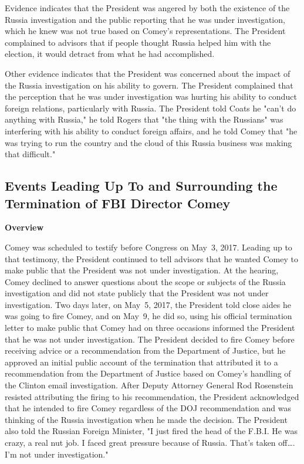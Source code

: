 Evidence indicates that the President was angered by both the existence of the Russia investigation and the public reporting that he was under investigation, which he knew was not true based on Comey's representations.
The President complained to advisors that if people thought Russia helped him with the election, it would detract from what he had accomplished.

Other evidence indicates that the President was concerned about the impact of the Russia investigation on his ability to govern.
The President complained that the perception that he was under investigation was hurting his ability to conduct foreign relations, particularly with Russia.
The President told Coats he "can't do anything with Russia," he told Rogers that "the thing with the Russians" was interfering with his ability to conduct foreign affairs, and he told Comey that "he was trying to run the country and the cloud of this Russia business was making that difficult."

\subsection{Events Leading Up To and Surrounding the Termination of FBI Director Comey}

\begin{center}
\textbf{Overview}
\end{center}

Comey was scheduled to testify before Congress on May~3, 2017.
Leading up to that testimony, the President continued to tell advisors that he wanted Comey to make public that the President was not under investigation.
At the hearing, Comey declined to answer questions about the scope or subjects of the Russia investigation and did not state publicly that the President was not under investigation.
Two days later, on May~5, 2017, the President told close aides he was going to fire Comey, and on May~9, he did so, using his official termination letter to make public that Comey had on three occasions informed the President that he was not under investigation.
The President decided to fire Comey before receiving advice or a recommendation from the Department of Justice, but he approved an initial public account of the termination that attributed it to a recommendation from the Department of Justice based on Comey's handling of the Clinton email investigation.
After Deputy Attorney General Rod Rosenstein resisted attributing the firing to his recommendation, the President acknowledged that he intended to fire Comey regardless of the DOJ recommendation and was thinking of the Russia investigation when he made the decision.
The President also told the Russian Foreign Minister, "I just fired the head of the F.B.I\null.
He was crazy, a real nut job.
I faced great pressure because of Russia.
That's taken off\dots.
I'm not under investigation."

